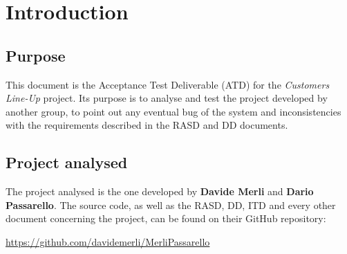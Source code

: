 \chapter{Introduction}

\section{Purpose}
This document is the Acceptance Test Deliverable (ATD) for the \textit{Customers Line-Up} project. Its purpose is to analyse and test the project developed by another group, to point out any eventual bug of the system and inconsistencies with the requirements described in the RASD and DD documents.


\section{Project analysed}
The project analysed is the one developed by \textbf{Davide Merli} and \textbf{Dario Passarello}. 
The source code, as well as the RASD, DD, ITD and every other document concerning the project, can be found on their GitHub repository:

\href{https://github.com/davidemerli/MerliPassarello}{https://github.com/davidemerli/MerliPassarello}

